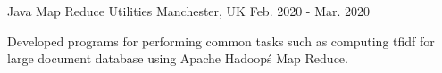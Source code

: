 \begin{cventries}
  


  \cventry
    {Java} %
    {Map Reduce Utilities} %
    {Manchester, UK} %
    {Feb. 2020 - Mar. 2020} %
    {
      \begin{cvitems} %
        \item {Developed programs for performing common tasks such as computing tfidf for large document database using Apache Hadoop\'s Map Reduce.}
      \end{cvitems}
    }
  


\end{cventries}
